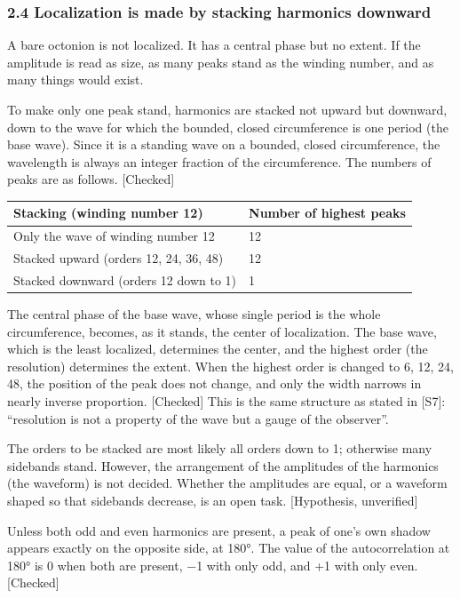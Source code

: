 \documentclass[
  a4paper,
]{article}
\newcounter{none} %
\begin{document}
\subsubsection{2.4 Localization is made by stacking harmonics
downward}\label{localization-is-made-by-stacking-harmonics-downward}

A bare octonion is not localized. It has a central phase but no extent.
If the amplitude is read as size, as many peaks stand as the winding
number, and as many things would exist.

To make only one peak stand, harmonics are stacked not upward but
downward, down to the wave for which the bounded, closed circumference
is one period (the base wave). Since it is a standing wave on a bounded,
closed circumference, the wavelength is always an integer fraction of
the circumference. The numbers of peaks are as follows. {[}Checked{]}

{\def\LTcaptype{none} %
\begin{longtable}[]{@{}ll@{}}
\toprule\noalign{}
Stacking (winding number 12) & Number of highest peaks \\
\midrule\noalign{}
\endhead
\bottomrule\noalign{}
\endlastfoot
Only the wave of winding number 12 & 12 \\
Stacked upward (orders 12, 24, 36, 48) & 12 \\
Stacked downward (orders 12 down to 1) & 1 \\
\end{longtable}
}

The central phase of the base wave, whose single period is the whole
circumference, becomes, as it stands, the center of localization. The
base wave, which is the least localized, determines the center, and the
highest order (the resolution) determines the extent. When the highest
order is changed to 6, 12, 24, 48, the position of the peak does not
change, and only the width narrows in nearly inverse proportion.
{[}Checked{]} This is the same structure as stated in {[}S7{]}:
``resolution is not a property of the wave but a gauge of the
observer''.

The orders to be stacked are most likely all orders down to 1; otherwise
many sidebands stand. However, the arrangement of the amplitudes of the
harmonics (the waveform) is not decided. Whether the amplitudes are
equal, or a waveform shaped so that sidebands decrease, is an open task.
{[}Hypothesis, unverified{]}

Unless both odd and even harmonics are present, a peak of one's own
shadow appears exactly on the opposite side, at 180°. The value of the
autocorrelation at 180° is 0 when both are present, −1 with only odd,
and +1 with only even. {[}Checked{]}
\end{document}
